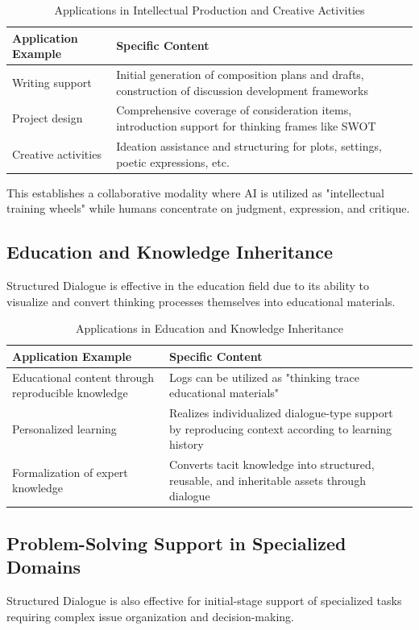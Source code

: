 \documentclass[11pt]{article}
\begin{document}
\begin{table}[htbp]
\centering
\caption{Applications in Intellectual Production and Creative Activities}
\begin{tabular}{p{4cm}|p{8cm}}
\hline
\textbf{Application Example} & \textbf{Specific Content} \\
\hline
Writing support & Initial generation of composition plans and drafts, construction of discussion development frameworks \\
\hline
Project design & Comprehensive coverage of consideration items, introduction support for thinking frames like SWOT \\
\hline
Creative activities & Ideation assistance and structuring for plots, settings, poetic expressions, etc. \\
\hline
\end{tabular}
\label{tab:intellectual-production}
\end{table}

This establishes a collaborative modality where AI is utilized as "intellectual training wheels" while humans concentrate on judgment, expression, and critique.
\subsection{Education and Knowledge Inheritance}
Structured Dialogue is effective in the education field due to its ability to visualize and convert thinking processes themselves into educational materials.

\begin{table}[htbp]
\centering
\caption{Applications in Education and Knowledge Inheritance}
\begin{tabular}{p{4cm}|p{8cm}}
\hline
\textbf{Application Example} & \textbf{Specific Content} \\
\hline
Educational content through reproducible knowledge & Logs can be utilized as "thinking trace educational materials" \\
\hline
Personalized learning & Realizes individualized dialogue-type support by reproducing context according to learning history \\
\hline
Formalization of expert knowledge & Converts tacit knowledge into structured, reusable, and inheritable assets through dialogue \\
\hline
\end{tabular}
\label{tab:education}
\end{table}
\subsection{Problem-Solving Support in Specialized Domains}
Structured Dialogue is also effective for initial-stage support of specialized tasks requiring complex issue organization and decision-making.
\end{document}
